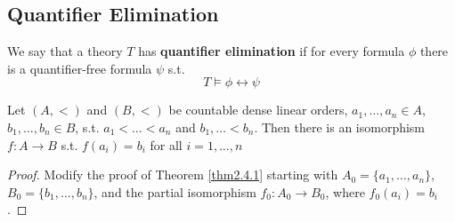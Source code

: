 \documentclass[11pt]{article}
\begin{document}
\subsection{Quantifier Elimination}
\label{sec:org544f680}
\begin{definition}[]
We say that a theory \(T\) has \textbf{quantifier elimination} if for every formula \(\phi\)
there is a quantifier-free formula \(\psi\) s.t.
\begin{equation*}
T\models\phi\leftrightarrow\psi
\end{equation*}
\end{definition}

\begin{lemma}[]
Let \((A,<)\) and \((B,<)\) be countable dense linear orders,
\(a_1,\dots,a_n\in A\), \(b_1,\dots,b_n\in B\), s.t. \(a_1<\dots<a_n\) and
\(b_1,\dots<b_n\). Then there is an isomorphism \(f:A\to B\) s.t.
\(f(a_i)=b_i\) for all \(i=1,\dots,n\)
\end{lemma}

\begin{proof}
Modify the proof of Theorem \ref{thm2.4.1} starting with
\(A_0=\{a_1,\dots,a_n\}\), \(B_0=\{b_1,\dots,b_n\}\), and the partial
isomorphism \(f_0:A_0\to B_0\), where \(f_0(a_i)=b_i\).
\end{proof}
\end{document}
